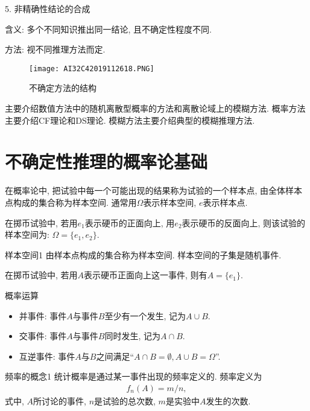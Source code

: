 5. 非精确性结论的合成

    含义: 多个不同知识推出同一结论, 且不确定性程度不同.

    方法: 视不同推理方法而定.
\begin{figure}[H]
    \centering
    \texttt{[image: AI32C42019112618.PNG]}
    \caption{不确定方法的结构}
    \label{AI32fig2618}
\end{figure}
\begin{remark}
  主要介绍数值方法中的随机离散型概率的方法和离散论域上的模糊方法. 概率方法主要介绍CF理论和DS理论. 模糊方法主要介绍典型的模糊推理方法.
\end{remark}
\section{不确定性推理的概率论基础}\label{AI32C6Sec6.3}
在概率论中, 把试验中每一个可能出现的结果称为试验的一个样本点, 由全体样本点构成的集合称为样本空间.
通常用$\Omega$表示样本空间, $e$表示样本点.

\begin{example}
  在掷币试验中, 若用$e_1$表示硬币的正面向上, 用$e_2$表示硬币的反面向上, 则该试验的样本空间为: $\Omega=\{e_1, e_2\}$.
\end{example}

\begin{mydef}{样本空间}{1}
    由样本点构成的集合称为样本空间. 样本空间的子集是随机事件.
\end{mydef}

\begin{example}
  在掷币试验中, 若用$A$表示硬币正面向上这一事件, 则有$A=\{e_1\}$.
\end{example}

概率运算
\begin{itemize}
\item 并事件: 事件$A$与事件$B$至少有一个发生, 记为$A\cup B$.

\item 交事件: 事件$A$与事件$B$同时发生, 记为$A\cap B$.

\item 互逆事件: 事件$A$与$B$之间满足“$A\cap B=\emptyset,  A\cup B=\Omega$”.
\end{itemize}

\begin{mydef}{频率的概念}{1}
统计概率是通过某一事件出现的频率定义的. 频率定义为
\begin{align}
    f_n(A)=m/n,
\end{align}
式中, $A$所讨论的事件, $n$是试验的总次数, $m$是实验中$A$发生的次数.
\end{mydef}

